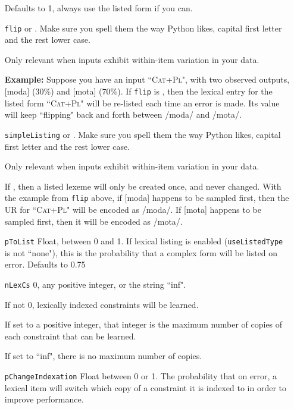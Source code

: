 \documentclass[12]{article}
\begin{document}
\begin{itemize}
	Defaults to 1, always use the listed form if you can.
	
	\item[\texttt{flip}]   or .  Make sure you spell them the way Python likes, capital first letter and the rest lower case.
	
	Only relevant when inputs exhibit within-item variation in your data.  
	
	{\bf Example:} Suppose you have an input ``\textsc{Cat+Pl}", with two observed outputs, [moda] (30\%) and [mota] (70\%).  If \texttt{flip} is , then the lexical entry for the listed form ``\textsc{Cat+Pl}" will be re-listed each time an error is made.  Its value will keep ``flipping" back and forth between /moda/ and /mota/.
	
	\item[\texttt{simpleListing}] or .  Make sure you spell them the way Python likes, capital first letter and the rest lower case.
	
	Only relevant when inputs exhibit within-item variation in your data.  
	
	If , then a listed lexeme will only be created once, and never changed.  With the example from \texttt{flip} above, if [moda] happens to be sampled first, then the UR for ``\textsc{Cat+Pl}" will be encoded as /moda/.  If [mota] happens to be sampled first, then it will be encoded as /mota/.
	
	\item[\texttt{pToList}]  Float, between 0 and 1.  If lexical listing is enabled (\texttt{useListedType} is not ``none"), this is the probability that a complex form will be listed on error.  Defaults to 0.75
	
	\item[\texttt{nLexCs}] 0, any positive integer, or the string ``inf".  
	
	If not 0, lexically indexed constraints will be learned.
	
	If set to a positive integer, that integer is the maximum number of copies of each constraint that can be learned.
	
	If set to ``inf", there is no maximum number of copies.
	
	\item[\texttt{pChangeIndexation}] Float between 0 or 1.  The probability that on error, a lexical item will switch which copy of a constraint it is indexed to in order to improve performance.
	

\end{itemize}
\end{document}
